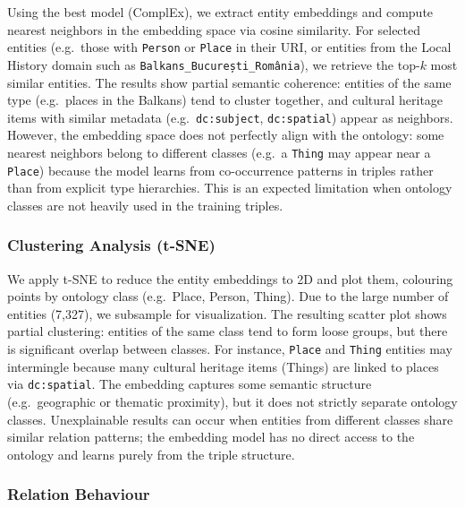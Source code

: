 \documentclass[11pt,a4paper]{article}
\begin{document}
  Using the best model (ComplEx), we extract entity embeddings and compute nearest neighbors in the embedding space via cosine similarity. For selected entities (e.g.\ those with \texttt{Person} or \texttt{Place} in their URI, or entities from the Local History domain such as \texttt{Balkans\_București\_România}), we retrieve the top-$k$ most similar entities. The results show partial semantic coherence: entities of the same type (e.g.\ places in the Balkans) tend to cluster together, and cultural heritage items with similar metadata (e.g.\ \texttt{dc:subject}, \texttt{dc:spatial}) appear as neighbors. However, the embedding space does not perfectly align with the ontology: some nearest neighbors belong to different classes (e.g.\ a \texttt{Thing} may appear near a \texttt{Place}) because the model learns from co-occurrence patterns in triples rather than from explicit type hierarchies. This is an expected limitation when ontology classes are not heavily used in the training triples.

  \subsubsection{Clustering Analysis (t-SNE)}

  We apply t-SNE to reduce the entity embeddings to 2D and plot them, colouring points by ontology class (e.g.\ Place, Person, Thing). Due to the large number of entities (7,327), we subsample for visualization. The resulting scatter plot shows partial clustering: entities of the same class tend to form loose groups, but there is significant overlap between classes. For instance, \texttt{Place} and \texttt{Thing} entities may intermingle because many cultural heritage items (Things) are linked to places via \texttt{dc:spatial}. The embedding captures some semantic structure (e.g.\ geographic or thematic proximity), but it does not strictly separate ontology classes. Unexplainable results can occur when entities from different classes share similar relation patterns; the embedding model has no direct access to the ontology and learns purely from the triple structure.

  \subsubsection{Relation Behaviour}
\end{document}

